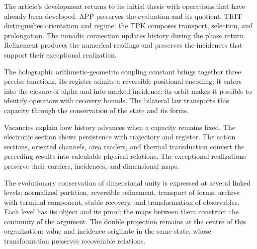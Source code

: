 
The article's development returns to its initial thesis with operations
that have already been developed. APP preserves the evaluation and its
quotient; TRIT distinguishes orientation and regime; the TPK composes
transport, selection, and prolongation. The nonadic connection updates
history during the phase return. Refinement produces the numerical
readings and preserves the incidences that support their exceptional
realization.

The holographic arithmetic-geometric coupling constant brings together
three precise functions. Its register admits a reversible positional
encoding; it enters into the closure of alpha and into marked incidence;
its orbit makes it possible to identify operators with recovery bounds.
The bilateral law transports this capacity through the conservation of
the state and its forms.

Vacancies explain how history advances when a capacity remains fixed.
The electronic section shows persistence with trajectory and register.
The action sections, oriented channels, area readers, and thermal
transduction convert the preceding results into calculable physical
relations. The exceptional realizations preserve their carriers,
incidences, and dimensional maps.

The evolutionary conservation of dimensional unity is expressed at
several linked levels: normalized partition, reversible refinement,
transport of forms, archive with terminal component, stable recovery,
and transformation of observables. Each level has its object and its
proof; the maps between them construct the continuity of the argument.
The double projection remains at the centre of this organization:
value and incidence originate in the same state, whose transformation
preserves recoverable relations.
